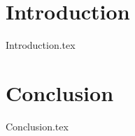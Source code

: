 \documentclass[a4paper]{article}
\title{\thisTitle}
\author{\thisAuthor}
\date{\thisDate}
\newcommand{\thisAbstractName}{Abstract}
\newcommand{\thisTOCName}{Table of contents}
\begin{document}
\maketitle
\thispagestyle{empty}

\renewcommand{\abstractname}{\thisAbstractName}
\begin{abstract}
  {Abstract.tex}
\end{abstract}
\clearpage


\renewcommand{\contentsname}{\thisTOCName}
\tableofcontents
\clearpage


\section{Introduction}
{Introduction.tex}

\section{Conclusion}
{Conclusion.tex}


\printbibliography
\end{document}
